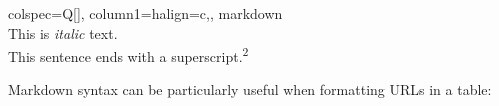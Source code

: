 \documentclass[
  letterpaper,
  DIV=11,
  numbers=noendperiod]{scrartcl}
\begin{document}
\begin{table}[H]
\centering
\begin{tblr}[         %
]                     %
{                     %
colspec={Q[]},
column{1}={halign=c,},
}                     %
\toprule
markdown \\ \midrule %
This is \emph{italic} text. \\
This sentence ends with a superscript.\textsuperscript{2} \\
\bottomrule
\end{tblr}
\end{table}

Markdown syntax can be particularly useful when formatting URLs in a
table:
\end{document}
